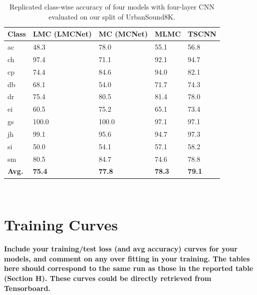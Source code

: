 \documentclass[conference]{IEEEtran}
\begin{document}
\begin{table}[h]
\begin{tabular}{|l|l|l|l|l|}
\hline
\textbf{Class} & \textbf{LMC (LMCNet)} & \textbf{MC (MCNet)} & \textbf{MLMC} & \textbf{TSCNN} \\ \hline
ac             & 48.3                  & 78.0                & 55.1          & 56.8           \\ \hline
ch             & 97.4                  & 71.1                & 92.1          & 94.7           \\ \hline
cp             & 74.4                  & 84.6                & 94.0          & 82.1           \\ \hline
db             & 68.1                  & 54.0                & 71.7          & 74.3           \\ \hline
dr             & 75.4                  & 80.5                & 81.4          & 78.0           \\ \hline
ei             & 60.5                  & 75.2                & 65.1          & 73.4           \\ \hline
gs             & 100.0                 & 100.0               & 97.1          & 97.1           \\ \hline
jh             & 99.1                  & 95.6                & 94.7          & 97.3           \\ \hline
si             & 50.0                  & 54.1                & 57.1          & 58.2           \\ \hline
sm             & 80.5                  & 84.7                & 74.6          & 78.8           \\ \hline
\rowcolor[HTML]{C0C0C0} 
\textbf{Avg.}  & \textbf{75.4}         & \textbf{77.8}       & \textbf{78.3} & \textbf{79.1}  \\ \hline
\end{tabular}
\\
\caption{Replicated class-wise accuracy of four models with four-layer CNN evaluated on our split of UrbanSound8K.}
\end{table}

\section{Training Curves}
\textbf{Include your training/test loss (and avg accuracy) curves for your models, and comment on any over fitting in your training. The tables here should correspond to the same run as those in the reported table (Section H). These curves could be directly retrieved from Tensorboard. }
\end{document}
